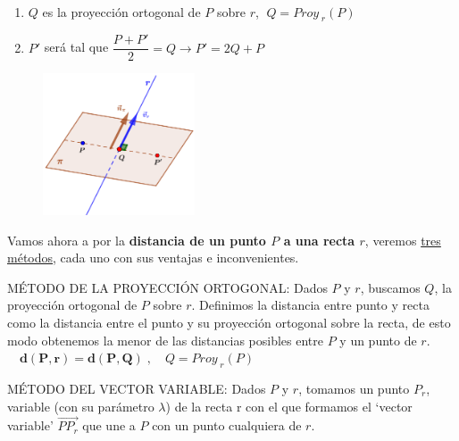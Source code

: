 \begin{multicols}{2}

$\quad$

	\begin{enumerate}
		\item $Q$ es la proyección ortogonal de $P$ sobre $r$, $\; Q=Proy_{\;r}(P)$
		\item $P'$ será tal que $\dfrac {P+P'}{2}=Q \to P'=2Q+P$	
	\end{enumerate}

	\begin{figure}[H]
		\centering
		\includegraphics[width=0.4\textwidth]{imagenes/imagenes11/T11IM07.png}
	\end{figure}
\end{multicols}


Vamos ahora a por la \textbf{distancia de un punto $P$ a una recta $r$}, veremos \underline{tres métodos}, cada uno con sus ventajas e inconvenientes.	

\noindent MÉTODO DE LA PROYECCIÓN ORTOGONAL: Dados $P$ y $r$, buscamos $Q$, la proyección ortogonal de $P$ sobre $r$. Definimos la distancia entre punto y recta como la distancia entre el punto y su proyección ortogonal sobre la recta, de esto modo obtenemos la menor de las distancias posibles entre $P$ y un punto de $r$. $\quad \boldsymbol{ d(P,r)=d(P,Q) }\; ,\quad  Q=Proy_{\;r}(P)$

\noindent MÉTODO DEL VECTOR VARIABLE: Dados $P$ y $r$, tomamos un punto $P_r$, variable (con su parámetro $\lambda$) de la recta r con el que formamos el `vector variable' $\overrightarrow{PP_r}$ que une a $P$ con un punto cualquiera de $r$. 

